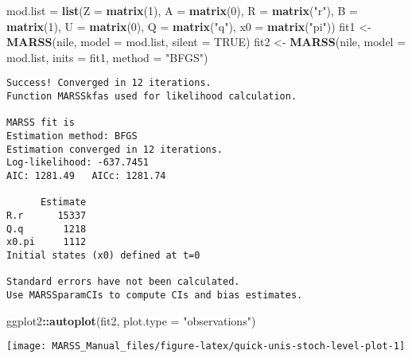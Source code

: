 \documentclass[12pt,]{book}
\newenvironment{Shaded}{\begin{snugshade}}{\end{snugshade}}
\newcommand{\DataTypeTok}[1]{\textcolor[rgb]{0.13,0.29,0.53}{#1}}
\newcommand{\DecValTok}[1]{\textcolor[rgb]{0.00,0.00,0.81}{#1}}
\newcommand{\KeywordTok}[1]{\textcolor[rgb]{0.13,0.29,0.53}{\textbf{#1}}}
\newcommand{\NormalTok}[1]{#1}
\newcommand{\OperatorTok}[1]{\textcolor[rgb]{0.81,0.36,0.00}{\textbf{#1}}}
\newcommand{\OtherTok}[1]{\textcolor[rgb]{0.56,0.35,0.01}{#1}}
\newcommand{\StringTok}[1]{\textcolor[rgb]{0.31,0.60,0.02}{#1}}
\begin{document}
\begin{Shaded}
\begin{Highlighting}[]
\NormalTok{mod.list =}\StringTok{ }\KeywordTok{list}\NormalTok{(}\DataTypeTok{Z =} \KeywordTok{matrix}\NormalTok{(}\DecValTok{1}\NormalTok{), }\DataTypeTok{A =} \KeywordTok{matrix}\NormalTok{(}\DecValTok{0}\NormalTok{), }\DataTypeTok{R =} \KeywordTok{matrix}\NormalTok{(}\StringTok{"r"}\NormalTok{), }
    \DataTypeTok{B =} \KeywordTok{matrix}\NormalTok{(}\DecValTok{1}\NormalTok{), }\DataTypeTok{U =} \KeywordTok{matrix}\NormalTok{(}\DecValTok{0}\NormalTok{), }\DataTypeTok{Q =} \KeywordTok{matrix}\NormalTok{(}\StringTok{"q"}\NormalTok{), }\DataTypeTok{x0 =} \KeywordTok{matrix}\NormalTok{(}\StringTok{"pi"}\NormalTok{))}
\NormalTok{fit1 <-}\StringTok{ }\KeywordTok{MARSS}\NormalTok{(nile, }\DataTypeTok{model =}\NormalTok{ mod.list, }\DataTypeTok{silent =} \OtherTok{TRUE}\NormalTok{)}
\NormalTok{fit2 <-}\StringTok{ }\KeywordTok{MARSS}\NormalTok{(nile, }\DataTypeTok{model =}\NormalTok{ mod.list, }\DataTypeTok{inits =}\NormalTok{ fit1, }\DataTypeTok{method =} \StringTok{"BFGS"}\NormalTok{)}
\end{Highlighting}
\end{Shaded}

\begin{verbatim}
Success! Converged in 12 iterations.
Function MARSSkfas used for likelihood calculation.

MARSS fit is
Estimation method: BFGS 
Estimation converged in 12 iterations. 
Log-likelihood: -637.7451 
AIC: 1281.49   AICc: 1281.74   
 
      Estimate
R.r      15337
Q.q       1218
x0.pi     1112
Initial states (x0) defined at t=0

Standard errors have not been calculated. 
Use MARSSparamCIs to compute CIs and bias estimates.
\end{verbatim}

\begin{Shaded}
\begin{Highlighting}[]
\NormalTok{ggplot2}\OperatorTok{::}\KeywordTok{autoplot}\NormalTok{(fit2, }\DataTypeTok{plot.type =} \StringTok{"observations"}\NormalTok{)}
\end{Highlighting}
\end{Shaded}

\begin{center}\texttt{[image: MARSS\_Manual\_files/figure-latex/quick-unis-stoch-level-plot-1]} \end{center}
\end{document}
